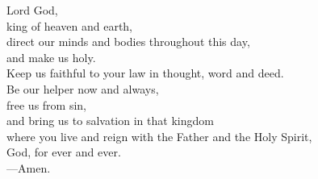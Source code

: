 \prayer


\begin{prayerverse}
Lord God,\\
king of heaven and earth,\\
direct our minds and bodies throughout this day,\\
and make us holy.\\
Keep us faithful to your law in thought, word and deed.\\
Be our helper now and always,\\
free us from sin,\\
and bring us to salvation in that kingdom\\
where you live and reign with the Father and the Holy Spirit,\\
God, for ever and ever.\\
{\color{red}---\thinspace}Amen.
\end{prayerverse}

